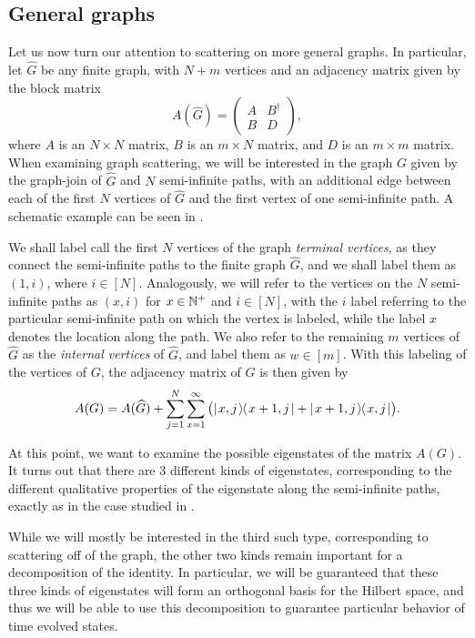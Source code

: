 \documentclass[../thesis-main/thesis-main]{subfiles}
\begin{document}
\subsection{General graphs}\label{sec:general_graphs}

Let us now turn our attention to scattering on more general graphs.  In particular, let $\widehat{G}$ be any finite graph, with $N+m$ vertices and an adjacency matrix given by the block matrix
\begin{equation}
  A(\widehat{G}) = \begin{pmatrix}A & B^\dag\\ B & D\end{pmatrix},
\end{equation}
where $A$ is an $N\times N$ matrix, $B$ is an $m\times N$ matrix, and $D$ is an $m\times m$ matrix.  When examining graph scattering, we will be interested in the graph $G$ given by the graph-join of $\widehat{G}$ and $N$ semi-infinite paths, with an additional edge between each of the first $N$ vertices of $\widehat{G}$ and the first vertex of one semi-infinite path.  A schematic example can be seen in .

We shall label call the first $N$ vertices of the graph \emph{terminal vertices}, as they connect the semi-infinite paths to the finite graph $\widehat{G}$, and we shall label them as $(1,i)$, where $i\in[N]$.  Analogously, we will refer to the vertices on the $N$ semi-infinite paths as $(x,i)$ for $x\in \mathbb{N}^+$ and $i\in[N]$, with the $i$ label referring to the particular semi-infinite path on which the vertex is labeled, while the label $x$ denotes the location along the path.  We also refer to the remaining $m$ vertices of $\widehat{G}$ as the \textit{internal vertices} of $\widehat{G}$, and label them as $w\in[m]$.  With this labeling of the vertices of $G$, the adjacency matrix of $G$ is then given by
\begin{equation}
  A(G) = A(\widehat{G}) + \sum_{j=1}^N \sum_{x=1}^\infty \big(|\mspace{2mu} x,j \mspace{2mu} \rangle\mspace{-2mu}\langle\mspace{2mu} x+1,j \mspace{2mu} | + |\mspace{2mu} x+1,j \mspace{2mu} \rangle\mspace{-2mu}\langle\mspace{2mu} x,j \mspace{2mu} |\big).
\end{equation}

At this point, we want to examine the possible eigenstates of the matrix $A(G)$.  It turns out that there are 3 different kinds of eigenstates, corresponding to the different qualitative properties of the eigenstate along the semi-infinite paths, exactly as in the case studied in .

While we will mostly be interested in the third such type, corresponding to scattering off of the graph, the other two kinds remain important for a decomposition of the identity.  In particular, we will be guaranteed that these three kinds of eigenstates will form an orthogonal basis for the Hilbert space, and thus we will be able to use this decomposition to guarantee particular behavior of time evolved states.
\end{document}
